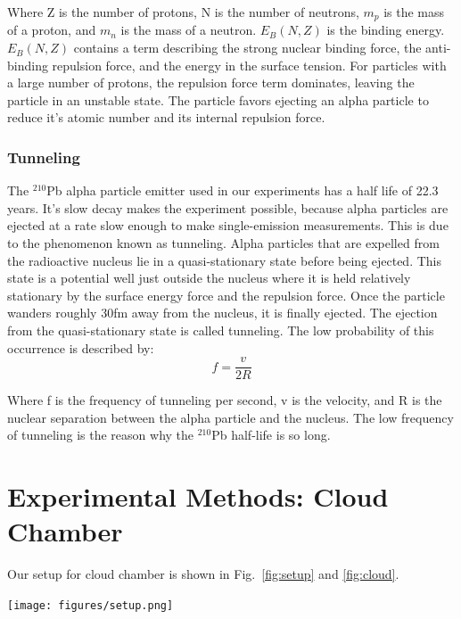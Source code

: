 \documentclass[letterpaper,12pt]{article}
\begin{document}
Where Z is the number of protons, N is the number of neutrons, $m_p$ is the mass of a proton, and $m_n$ is the mass of a neutron. $E_B(N,Z)$ is the binding energy. $E_B(N,Z)$ contains a term describing the strong nuclear binding force, the anti-binding repulsion force, and the energy in the surface tension. For particles with a large number of protons, the repulsion force term dominates, leaving the particle in an unstable state. The particle favors ejecting an alpha particle to reduce it's atomic number and its internal repulsion force. 

\subsubsection{Tunneling}

The $^{210}$Pb alpha particle emitter used in our experiments has a half life of 22.3 years. It's slow decay makes the experiment possible, because alpha particles are ejected at a rate slow enough to make single-emission measurements. This is due to the phenomenon known as tunneling. Alpha particles that are expelled from the radioactive nucleus lie in a quasi-stationary state before being ejected. This state is a potential well just outside the nucleus where it is held relatively stationary by the surface energy force and the repulsion force. Once the particle wanders roughly 30fm away from the nucleus, it is finally ejected. The ejection from the quasi-stationary state is called tunneling. The low probability of this occurrence is described by:
\begin{equation}
    f = \frac{v}{2R}
\end{equation}

Where f is the frequency of tunneling per second, v is the velocity, and R is the nuclear separation between the alpha particle and the nucleus. The low frequency of tunneling is the reason why the $^{210}$Pb half-life is so long.


\section{Experimental Methods: Cloud Chamber}
Our setup for cloud chamber is shown in Fig.~\ref{fig:setup} and \ref{fig:cloud}. 

\begin{center}
    \texttt{[image: figures/setup.png]}
    \label{fig:setup}
\end{center}
\end{document}
